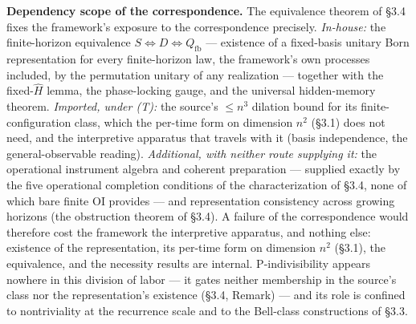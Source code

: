 \documentclass[
]{article}
\begin{document}
\textbf{Dependency scope of the correspondence.} The equivalence theorem
of §3.4 fixes the framework's exposure to the correspondence precisely.
\emph{In-house:} the finite-horizon equivalence
\(S \iff D \iff Q_{\mathrm{fb}}\) --- existence of a fixed-basis unitary
Born representation for every finite-horizon law, the framework's own
processes included, by the permutation unitary of any realization ---
together with the fixed-\(\hat{H}\) lemma, the phase-locking gauge, and
the universal hidden-memory theorem. \emph{Imported, under (T):} the
source's \(\leq n^3\) dilation bound for its finite-configuration class,
which the per-time form on dimension \(n^2\) (§3.1) does not need, and
the interpretive apparatus that travels with it (basis independence, the
general-observable reading). \emph{Additional, with neither route
supplying it:} the operational instrument algebra and coherent
preparation --- supplied exactly by the five operational completion
conditions of the characterization of §3.4, none of which bare finite OI
provides --- and representation consistency across growing horizons (the
obstruction theorem of §3.4). A failure of the correspondence would
therefore cost the framework the interpretive apparatus, and nothing
else: existence of the representation, its per-time form on dimension
\(n^2\) (§3.1), the equivalence, and the necessity results are internal.
P-indivisibility appears nowhere in this division of labor --- it gates
neither membership in the source's class nor the representation's
existence (§3.4, Remark) --- and its role is confined to nontriviality
at the recurrence scale and to the Bell-class constructions of §3.3.
\end{document}
